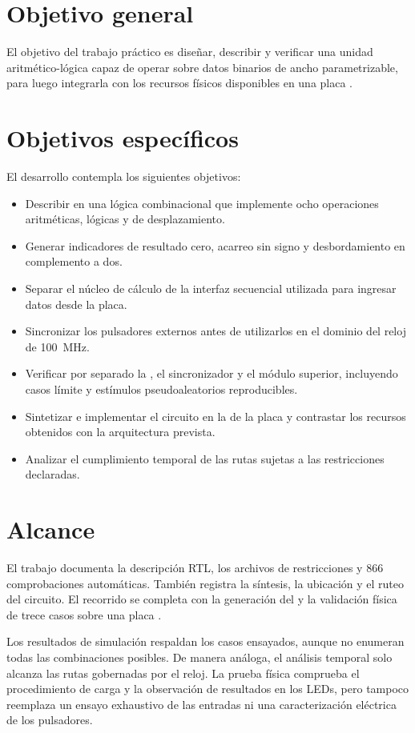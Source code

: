 
\section{Objetivo general}

El objetivo del trabajo práctico es diseñar, describir y verificar
una unidad aritmético-lógica capaz de operar sobre datos binarios de
ancho parametrizable, para luego integrarla con los recursos físicos
disponibles en una placa .

\section{Objetivos específicos}

El desarrollo contempla los siguientes objetivos:

\begin{itemize}
	\item Describir en  una lógica combinacional que
		implemente ocho operaciones aritméticas, lógicas y de desplazamiento.
	\item Generar indicadores de resultado cero, acarreo sin signo y
		desbordamiento en complemento a dos.
	\item Separar el núcleo de cálculo de la interfaz secuencial
		utilizada para ingresar datos desde la placa.
	\item Sincronizar los pulsadores externos antes de utilizarlos en el
		dominio del reloj de \SI{100}{\mega\hertz}.
	\item Verificar por separado la , el sincronizador y el
		módulo superior, incluyendo casos límite y estímulos
		pseudoaleatorios reproducibles.
	\item Sintetizar e implementar el circuito en la  de
		la placa y contrastar los recursos obtenidos con la arquitectura prevista.
	\item Analizar el cumplimiento temporal de las rutas sujetas a las
		restricciones declaradas.
\end{itemize}

\section{Alcance}

El trabajo documenta la descripción RTL, los archivos de
restricciones y 866 comprobaciones automáticas. También registra la
síntesis, la ubicación y el ruteo del circuito. El recorrido se
completa con la generación del  y la validación física
de trece casos sobre una placa .

Los resultados de simulación respaldan los casos ensayados, aunque no
enumeran todas las combinaciones posibles. De manera análoga, el
análisis temporal solo alcanza las rutas gobernadas por el reloj. La
prueba física comprueba el procedimiento de carga y la observación de
resultados en los LEDs, pero tampoco reemplaza un ensayo exhaustivo de
las entradas ni una caracterización eléctrica de los pulsadores.
